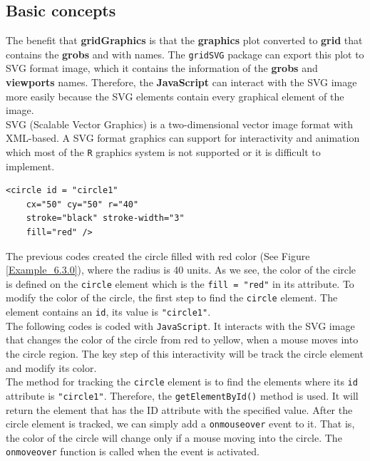 \documentclass[11pt,twoside]{report}
\begin{document}
\subsection{Basic concepts}
The benefit that \textbf{gridGraphics} is that the \textbf{graphics} plot converted to \textbf{grid} that contains the \textbf{grobs} and  with names. The \texttt{gridSVG} \citep{gridSVG} package can export this plot to SVG format image, which it contains the information of the \textbf{grobs} and \textbf{viewports} names. Therefore, the \textbf{JavaScript} \citep{javascript} can interact with the SVG image more easily because the SVG elements contain every graphical element of the image.\\

SVG (Scalable Vector Graphics) \citep{SVG} is a two-dimensional vector image format with XML-based. A SVG format graphics can support for interactivity and animation which most of the \texttt{R} graphics system is not supported or it is difficult to implement.

\begin{lstlisting}
<circle id = "circle1" 
    cx="50" cy="50" r="40" 
    stroke="black" stroke-width="3" 
    fill="red" />
\end{lstlisting}

The previous codes created the circle filled with red color (See Figure \ref{Example_6.3.0}), where the radius is 40 units. As we see, the color of the circle is defined on the \texttt{circle} element which is the \texttt{fill = "red"} in its attribute. To modify the color of the circle, the first step to find the \texttt{circle} element. The element contains an \texttt{id}, its value is \texttt{"circle1"}.\\

The following codes is coded with \texttt{JavaScript}. It interacts with the SVG image that changes the color of the circle from red to yellow, when a mouse moves into the circle region. The key step of this interactivity will be track the circle element and modify its color.\\

The method for tracking the \texttt{circle} element is to find the elements where its \texttt{id} attribute is \texttt{"circle1"}. Therefore, the \texttt{getElementById()} method is used. It will return the element that has the ID attribute with the specified value. After the circle element is tracked, we can simply add a \texttt{onmouseover} event to it. That is, the color of the circle will change only if a mouse moving into the circle. The \texttt{onmoveover} function is called when the event is activated.\\ 
\end{document}
